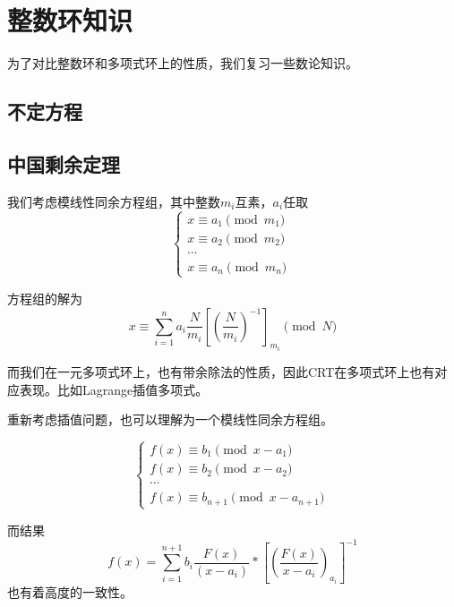 \documentclass{ctexart}
\begin{document}
\section{整数环知识}

为了对比整数环和多项式环上的性质，我们复习一些数论知识。

\subsection{不定方程}

\subsection{中国剩余定理}
我们考虑模线性同余方程组，其中整数$m_i$互素，$a_i$任取
\begin{equation*}  
    \left\{
      \begin{array}{l}
      x \equiv a_1 \pmod{m_1} \\
      x \equiv a_2 \pmod{m_2} \\
      \cdots\\
      x \equiv a_n \pmod{m_n} \
      \end{array}
    \right.
\end{equation*}

方程组的解为
\begin{equation*}
    x \equiv \sum_{i = 1}^n a_i \frac{N}{m_i} [(\frac{N}{m_i})^{-1}]_{m_i} \pmod N
\end{equation*}

而我们在一元多项式环上，也有带余除法的性质，因此CRT在多项式环上也有对应表现。比如Lagrange插值多项式。

重新考虑插值问题，也可以理解为一个模线性同余方程组。

\begin{equation*}  
    \left\{
      \begin{array}{l}
      f(x) \equiv b_1 \pmod{x - a_1} \\
      f(x) \equiv b_2 \pmod{x - a_2} \\
      \cdots\\
      f(x) \equiv b_{n + 1} \pmod{x - a_{n + 1}} \
      \end{array}
    \right.
\end{equation*}

而结果
\begin{equation*}
    f(x) = \sum_{i = 1}^{n + 1} b_i \frac{F(x)}{(x - a_i)} * [(\frac{F(x)}{x - a_i}) _{a_i}]^{-1}
\end{equation*}
也有着高度的一致性。
\end{document}

